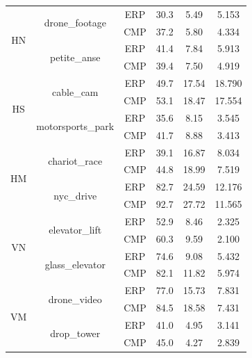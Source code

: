 \begin{longtable}{|c|c|c|c|c|c|}
\multirow{4}{*}{HN} & \multirow{2}{*}{drone\_footage}   & ERP &  30.3 &   5.49 &   5.153 \\ \cline{3-6}
                             &                          & CMP &  37.2 &   5.80 &   4.334 \\ \cline{2-6}
   & \multirow{2}{*}{petite\_anse}                      & ERP &  41.4 &   7.84 &   5.913 \\ \cline{3-6}
                             &                          & CMP &  39.4 &   7.50 &   4.919 \\ \hline
                             
\multirow{4}{*}{HS} & \multirow{2}{*}{cable\_cam}   & ERP &  49.7 &  17.54 &  18.790 \\ \cline{3-6}
                             &                      & CMP &  53.1 &  18.47 &  17.554 \\ \cline{2-6}
   & \multirow{2}{*}{motorsports\_park}             & ERP &  35.6 &   8.15 &   3.545 \\ \cline{3-6}
                             &                      & CMP &  41.7 &   8.88 &   3.413 \\ \hline
                             
\multirow{4}{*}{HM} & \multirow{2}{*}{chariot\_race}    & ERP &  39.1 &  16.87 &   8.034 \\ \cline{3-6}
                             &                          & CMP &  44.8 &  18.99 &   7.519 \\ \cline{2-6}
   & \multirow{2}{*}{nyc\_drive}                        & ERP &  82.7 &  24.59 &  12.176 \\ \cline{3-6}
                             &                          & CMP &  92.7 &  27.72 &  11.565 \\ \hline
                             
\multirow{4}{*}{VN} & \multirow{2}{*}{elevator\_lift}   & ERP &  52.9 &   8.46 &   2.325 \\ \cline{3-6}
                             &                          & CMP &  60.3 &   9.59 &   2.100 \\ \cline{2-6}
   & \multirow{2}{*}{glass\_elevator}                   & ERP &  74.6 &   9.08 &   5.432 \\ \cline{3-6}
                             &                          & CMP &  82.1 &  11.82 &   5.974 \\ \hline
                             
\multirow{4}{*}{VM} & \multirow{2}{*}{drone\_video} & ERP &  77.0 &  15.73 &   7.831 \\ \cline{3-6}
                             &                      & CMP &  84.5 &  18.58 &   7.431 \\ \cline{2-6}
   & \multirow{2}{*}{drop\_tower}                   & ERP &  41.0 &   4.95 &   3.141 \\ \cline{3-6}
                             &                      & CMP &  45.0 &   4.27 &   2.839 \\ \hline
                             

\end{longtable}
